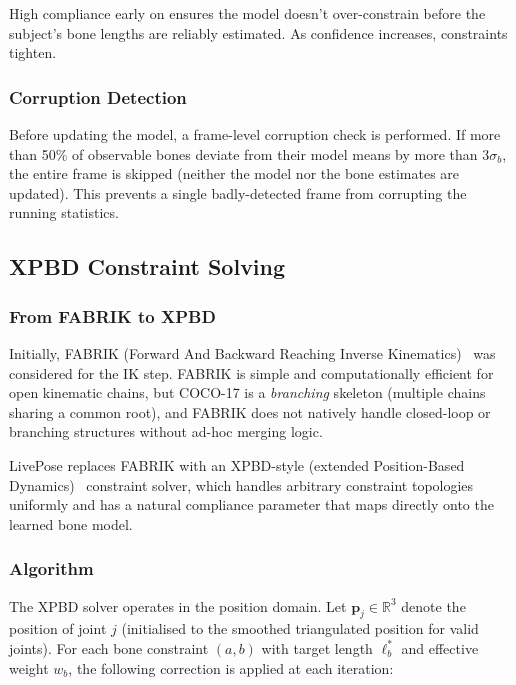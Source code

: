 \documentclass[11pt,a4paper]{article}
\newcommand{\R}{\mathbb{R}}
\begin{document}
High compliance early on ensures the model doesn't over-constrain before the subject's
bone lengths are reliably estimated. As confidence increases, constraints tighten.

\subsubsection{Corruption Detection}

Before updating the model, a frame-level corruption check is performed. If more than
50\% of observable bones deviate from their model means by more than $3\sigma_b$, the
entire frame is skipped (neither the model nor the bone estimates are updated). This
prevents a single badly-detected frame from corrupting the running statistics.

\subsection{XPBD Constraint Solving}

\subsubsection{From FABRIK to XPBD}

Initially, FABRIK (Forward And Backward Reaching Inverse Kinematics)~\cite{fabrik} was
considered for the IK step. FABRIK is simple and computationally efficient for open
kinematic chains, but COCO-17 is a \emph{branching} skeleton (multiple chains sharing
a common root), and FABRIK does not natively handle closed-loop or branching
structures without ad-hoc merging logic.

LivePose replaces FABRIK with an XPBD-style (extended Position-Based Dynamics)~\cite{xpbd}
constraint solver, which handles arbitrary constraint topologies uniformly and has a
natural compliance parameter that maps directly onto the learned bone model.

\subsubsection{Algorithm}

The XPBD solver operates in the position domain. Let $\mathbf{p}_j \in \R^3$ denote
the position of joint $j$ (initialised to the smoothed triangulated position for valid
joints). For each bone constraint $(a, b)$ with target length $\ell^*_b$ and effective
weight $w_b$, the following correction is applied at each iteration:
\end{document}
